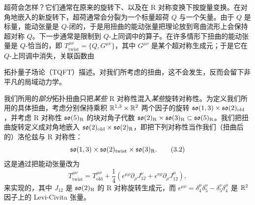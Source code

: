 超荷会怎样？它们通常在原来的旋转下、以及在 R 对称变换下按旋量变换。在对角地嵌入的新旋转下，超荷通常会分裂为一个标量超荷 $Q$ 与一个矢量。由于 $Q$ 是标量，能动张量是 $Q$-闭的，于是用扭曲的能动张量把理论放到弯曲流形上会保持超对称 $Q$。下一步通常是限制到 $Q$-上同调中的算子。在许多情形下扭曲的能动张量是 $Q$-恰当的，即 $T^{\mu\nu}_{\mathrm{twist}}=\{Q,G^{\mu\nu}\}$，其中 $G^{\mu\nu}$ 是某个超对称生成元；于是它在 $Q$-上同调中消失，关联函数由

拓扑量子场论（TQFT）描述。对我们所考虑的扭曲，这不会发生，反而会留下非平凡的局域动力学。

我们所用的\emph{部分}拓扑扭曲只把\emph{某些} R 对称性混入\emph{某些}旋转对称性。为定义我们所用的具体扭曲，考虑分别保持乘积 $\mathbb{R}^{1,3}\times\mathbb{R}^2$ 两个因子的旋转 $\mathfrak{so}(1,3)\times\mathfrak{so}(2)_{\mathrm{old}}$，并考虑 R 对称性 $\mathfrak{so}(5)_{\mathrm R}$ 的块对角子代数 $\mathfrak{so}(2)_{\mathrm R}\times\mathfrak{so}(3)_{\mathrm R}\subset\mathfrak{so}(5)_{\mathrm R}$。我们把扭曲旋转定义成对角地嵌入 $\mathfrak{so}(2)_{\mathrm{old}}\times\mathfrak{so}(2)_{\mathrm R}$，即把下列对称性当作我们（扭曲后的）洛伦兹与 R 对称性：
\begin{equation}
\mathfrak{so}(1,3)\times\mathfrak{so}(2)_{\mathrm{twist}}\times\mathfrak{so}(3)_{\mathrm R} .
\tag{3.2}
\end{equation}
这是通过把能动张量改为
\begin{equation}
T^{\mu\nu}_{\mathrm{twist}} = T^{\mu\nu}_{\mathrm{old}} + \frac{1}{4}\left(\epsilon^{\mu\rho}\partial_\rho J^{\nu}_{12} + \epsilon^{\nu\rho}\partial_\rho J^{\mu}_{12}\right) ,
\tag{3.3}
\end{equation}
来实现的，其中 $J_{12}$ 是 $\mathfrak{so}(2)_{\mathrm R}$ 的 R 对称旋转生成元，而 $\epsilon^{\mu\nu}=\delta^\mu_4\delta^\nu_5-\delta^\nu_5\delta^\mu_4$ 是 $\mathbb{R}^2$ 因子上的 Levi-Civita 张量。


